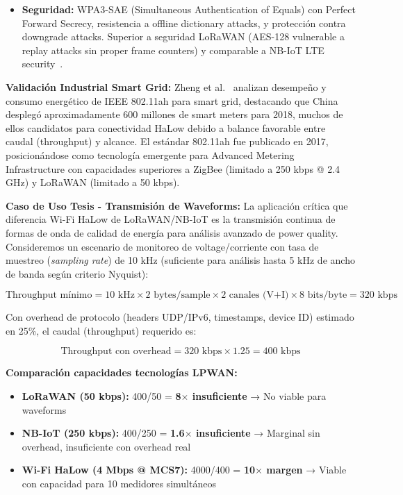 \begin{itemize}
\item \textbf{Seguridad:} WPA3-SAE (Simultaneous Authentication of Equals) con Perfect Forward Secrecy, resistencia a offline dictionary attacks, y protección contra downgrade attacks. Superior a seguridad LoRaWAN (AES-128 vulnerable a replay attacks sin proper frame counters) y comparable a NB-IoT LTE security~\cite{IEEE802.11ah-2016}.
\end{itemize}

\textbf{Validación Industrial Smart Grid:} Zheng et al.~\cite{zhengPerformancePowerConsumption2018} analizan desempeño y consumo energético de IEEE 802.11ah para smart grid, destacando que China desplegó aproximadamente 600 millones de smart meters para 2018, muchos de ellos candidatos para conectividad HaLow debido a balance favorable entre caudal (throughput) y alcance. El estándar 802.11ah fue publicado en 2017, posicionándose como tecnología emergente para Advanced Metering Infrastructure con capacidades superiores a ZigBee (limitado a 250 kbps @ 2.4 GHz) y LoRaWAN (limitado a 50 kbps).

\textbf{Caso de Uso Tesis - Transmisión de Waveforms:} La aplicación crítica que diferencia Wi-Fi HaLow de LoRaWAN/NB-IoT es la transmisión continua de formas de onda de calidad de energía para análisis avanzado de power quality. Consideremos un escenario de monitoreo de voltage/corriente con tasa de muestreo (\textit{sampling rate}) de 10 kHz (suficiente para análisis hasta 5 kHz de ancho de banda según criterio Nyquist):

\begin{equation}
\text{Throughput mínimo} = 10\text{ kHz} \times 2\text{ bytes/sample} \times 2\text{ canales (V+I)} \times 8\text{ bits/byte} = 320\text{ kbps}
\end{equation}

Con overhead de protocolo (headers UDP/IPv6, timestamps, device ID) estimado en 25\%, el caudal (throughput) requerido es:

\begin{equation}
\text{Throughput con overhead} = 320\text{ kbps} \times 1.25 = 400\text{ kbps}
\end{equation}

\textbf{Comparación capacidades tecnologías LPWAN:}
\begin{itemize}
\item \textbf{LoRaWAN (50 kbps):} 400/50 = \textbf{8$\times$ insuficiente} → No viable para waveforms
\item \textbf{NB-IoT (250 kbps):} 400/250 = \textbf{1.6$\times$ insuficiente} → Marginal sin overhead, insuficiente con overhead real
\item \textbf{Wi-Fi HaLow (4 Mbps @ MCS7):} 4000/400 = \textbf{10$\times$ margen} → Viable con capacidad para 10 medidores simultáneos
\end{itemize}

